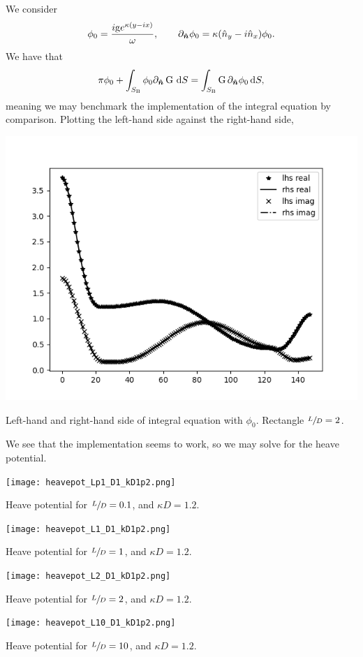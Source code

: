 We consider
\[
    \phi_0 = \frac{i \mathrm{g} e^{\kappa(y-ix)}}{\omega}, \qquad \partial_{\bm{\hat{n}}}\phi_0 = \kappa ( \hat{n}_y - i \hat{n}_x ) \phi_0.
\]
We have that
\[
    \pi \phi_0 + \int_{S_{\mathrm{B}}} \phi_0 \partial_{\bm{\hat{n}}} \operatorname{G} \,\mathrm{d} S = \int_{S_{\mathrm{B}}} \operatorname{G} \partial_{\bm{\hat{n}}} \phi_0 \,\mathrm{d} S,
\]
meaning we may benchmark the implementation of the integral equation by comparison.
Plotting the left-hand side against the right-hand side,
\begin{Figure}
    \centering
    \captionsetup{type = figure}
    \includegraphics[width = \textwidth]{phi0_L2_D1_kD1point2.png}
    \caption{Left-hand and right-hand side of integral equation with $\phi_0$. Rectangle $\sfrac{L}{D} = 2$.}
\end{Figure}
\noindent We see that the implementation seems to work, so we may solve for the heave potential.
\begin{Figure}
    \centering
    \captionsetup{type = figure}
    \texttt{[image: heavepot\_Lp1\_D1\_kD1p2.png]}
    \caption{Heave potential for $\sfrac{L}{D} = 0.1$, and $\kappa D = 1.2$.}
\end{Figure}
\begin{Figure}
    \centering
    \captionsetup{type = figure}
    \texttt{[image: heavepot\_L1\_D1\_kD1p2.png]}
    \caption{Heave potential for $\sfrac{L}{D} = 1$, and $\kappa D = 1.2$.}
\end{Figure}
\begin{Figure}
    \centering
    \captionsetup{type = figure}
    \texttt{[image: heavepot\_L2\_D1\_kD1p2.png]}
    \caption{Heave potential for $\sfrac{L}{D} = 2$, and $\kappa D = 1.2$.}
\end{Figure}
\begin{Figure}
    \centering
    \captionsetup{type = figure}
    \texttt{[image: heavepot\_L10\_D1\_kD1p2.png]}
    \caption{Heave potential for $\sfrac{L}{D} = 10$, and $\kappa D = 1.2$.}
\end{Figure}